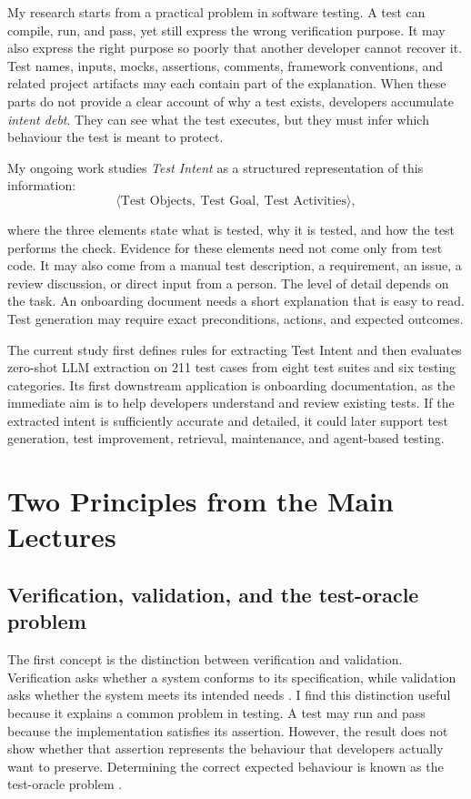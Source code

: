 My research starts from a practical problem in software testing. A test can compile, run, and pass, yet still express the wrong verification purpose. It may also express the right purpose so poorly that another developer cannot recover it. Test names, inputs, mocks, assertions, comments, framework conventions, and related project artifacts may each contain part of the explanation. When these parts do not provide a clear account of why a test exists, developers accumulate \emph{intent debt}. They can see what the test executes, but they must infer which behaviour the test is meant to protect.

My ongoing work studies \emph{Test Intent} as a structured representation of this information:
\[
\langle \text{Test Objects},\ \text{Test Goal},\ \text{Test Activities}\rangle,
\]

where the three elements state what is tested, why it is tested, and how the test performs the check. Evidence for these elements need not come only from test code. It may also come from a manual test description, a requirement, an issue, a review discussion, or direct input from a person. The level of detail depends on the task. An onboarding document needs a short explanation that is easy to read. Test generation may require exact preconditions, actions, and expected outcomes.

The current study first defines rules for extracting Test Intent and then evaluates zero-shot LLM extraction on 211 test cases from eight test suites and six testing categories. Its first downstream application is onboarding documentation, as the immediate aim is to help developers understand and review existing tests. If the extracted intent is sufficiently accurate and detailed, it could later support test generation, test improvement, retrieval, maintenance, and agent-based testing. 

\section{Two Principles from the Main Lectures}

\subsection{Verification, validation, and the test-oracle problem}

The first concept is the distinction between verification and validation. Verification asks whether a system conforms to its specification, while validation asks whether the system meets its intended needs \cite{DBLP:journals/software/Boehm84}. I find this distinction useful because it explains a common problem in testing. A test may run and pass because the implementation satisfies its assertion. However, the result does not show whether that assertion represents the behaviour that developers actually want to preserve. Determining the correct expected behaviour is known as the test-oracle problem \cite{DBLP:journals/tse/BarrHMSY15}.

